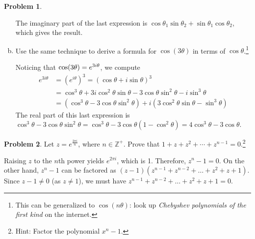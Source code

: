 \documentclass[11pt,oneside]{amsart}
\theoremstyle{definition}
\newtheorem{problem}{Problem}
\newcommand{\bZ}{\mathbb{Z}}
\let\Re\relax
\DeclareMathOperator{\Re}{Re}
\begin{document}
\begin{problem}
\begin{enumerate}[(a)]
\begin{solution}
                The imaginary part of the last expression is $\cos\theta_1\sin\theta_2+\sin\theta_1\cos\theta_2$, which gives the result.
            \end{solution}
            \item Use the same technique to derive a formula for $\cos(3\theta)$ in terms of $\cos\theta$.\footnote{This can be generalized to $\cos(n\theta)$: look up \emph{Chebyshev polynomials of the first kind} on the internet.}
            \begin{solution}
                Noticing that $\cos(3\theta)=\Re e^{3i\theta}$, we compute
                \[\begin{split}
                    e^{3i\theta} &= (e^{i\theta})^3 =(\cos\theta+i\sin\theta)^3\\
                    &= \cos^3\theta+3i\cos^2\theta\sin\theta-3\cos\theta\sin^2\theta-i\sin^3\theta\\
                    &= (\cos^3\theta-3\cos\theta\sin^2\theta)+i(3\cos^2\theta\sin\theta-\sin^3\theta)
                \end{split}\]
                The real part of this last expression is $\cos^3\theta-3\cos\theta\sin^2\theta=\cos^3\theta-3\cos\theta(1-\cos^2\theta)=4\cos^3\theta-3\cos\theta$.
            \end{solution}
        \end{enumerate}
    \end{problem}

    \begin{problem}
        Let $z=e^{\frac{2\pi i}n}$, where $n\in\bZ^+$. Prove that $1+z+z^2+\cdots+z^{n-1}=0$.\footnote{Hint: Factor the polynomial $x^n-1$.}
    \end{problem}
    \begin{solution}
        Raising $z$ to the $n$th power yields $e^{2\pi i}$, which is 1. Therefore, $z^n-1=0$. On the other hand, $z^n-1$ can be factored as $(z-1)(z^{n-1}+z^{n-2}+\dots+z^2+z+1)$. Since $z-1\neq 0$ (as $z\neq 1$), we must have $z^{n-1}+z^{n-2}+\dots+z^2+z+1=0$.
    \end{solution}
\end{document}
